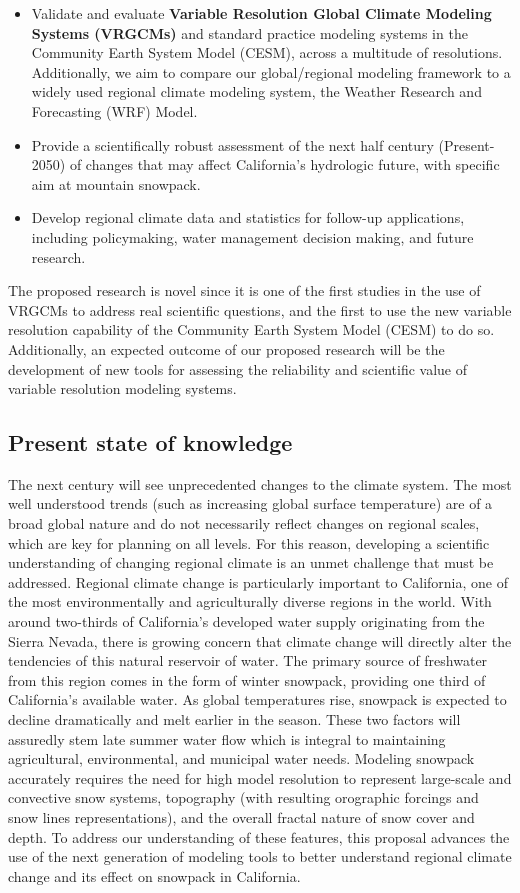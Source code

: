 \documentclass[11pt]{article}
\begin{document}
\begin{itemize}
  \item Validate and evaluate \textbf{Variable Resolution Global Climate Modeling Systems (VRGCMs)} and standard practice modeling systems in the Community Earth System Model (CESM), across a multitude of resolutions.  Additionally, we aim to compare our global/regional modeling framework to a widely used regional climate modeling system, the Weather Research and Forecasting (WRF) Model.
  \item Provide a scientifically robust assessment of the next half century (Present-2050) of changes that may affect California's hydrologic future, with specific aim at mountain snowpack. 
  \item Develop regional climate data and statistics for follow-up applications, including policymaking, water management decision making, and future research.
\end{itemize}
The proposed research is novel since it is one of the first studies in the use of VRGCMs to address real scientific questions, and the first to use the new variable resolution capability of the Community Earth System Model (CESM) to do so. Additionally, an expected outcome of our proposed research will be the development of new tools for assessing the reliability and scientific value of variable resolution modeling systems.
\subsection{Present state of knowledge}
The next century will see unprecedented changes to the climate system. The most well understood trends (such as increasing global surface temperature) are of a broad global nature and do not necessarily reflect changes on regional scales, which are key for planning on all levels. For this reason, developing a scientific understanding of changing regional climate is an unmet challenge that must be addressed. Regional climate change is particularly important to California, one of the most environmentally and agriculturally diverse regions in the world. With around two-thirds of California's developed water supply originating from the Sierra Nevada, there is growing concern that climate change will directly alter the tendencies of this natural reservoir of water.  The primary source of freshwater from this region comes in the form of winter snowpack, providing one third of California’s available water.  As global temperatures rise, snowpack is expected to decline dramatically and melt earlier in the season.  These two factors will assuredly stem late summer water flow which is integral to maintaining agricultural, environmental, and municipal water needs.  Modeling snowpack accurately requires the need for high model resolution to represent large-scale and convective snow systems, topography (with resulting orographic forcings and snow lines representations), and the overall fractal nature of snow cover and depth. To address our understanding of these features, this proposal advances the use of the next generation of modeling tools to better understand regional climate change and its effect on snowpack in California.
\end{document}
